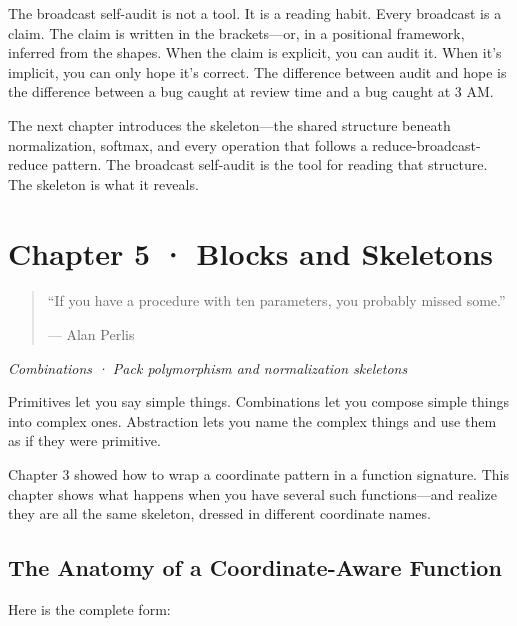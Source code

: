 \documentclass[11pt,titlepage]{article}
\begin{document}
The broadcast self-audit is not a tool. It is a reading habit. Every
broadcast is a claim. The claim is written in the brackets---or, in a
positional framework, inferred from the shapes. When the claim is
explicit, you can audit it. When it's implicit, you can only hope it's
correct. The difference between audit and hope is the difference between
a bug caught at review time and a bug caught at 3 AM.

The next chapter introduces the skeleton---the shared structure beneath
normalization, softmax, and every operation that follows a
reduce-broadcast-reduce pattern. The broadcast self-audit is the tool
for reading that structure. The skeleton is what it reveals.

\newpage

\hypertarget{chapter-5-blocks-and-skeletons}{%
\section{Chapter 5 · Blocks and
Skeletons}\label{chapter-5-blocks-and-skeletons}}

\begin{quote}
``If you have a procedure with ten parameters, you probably missed
some.''

--- Alan Perlis
\end{quote}

\emph{Combinations · Pack polymorphism and normalization skeletons}

\vspace{2em}

Primitives let you say simple things. Combinations let you compose
simple things into complex ones. Abstraction lets you name the complex
things and use them as if they were primitive.

Chapter 3 showed how to wrap a coordinate pattern in a function
signature. This chapter shows what happens when you have several such
functions---and realize they are all the same skeleton, dressed in
different coordinate names.

\vspace{2em}

\hypertarget{the-anatomy-of-a-coordinate-aware-function}{%
\subsection{The Anatomy of a Coordinate-Aware
Function}\label{the-anatomy-of-a-coordinate-aware-function}}

Here is the complete form:
\end{document}

